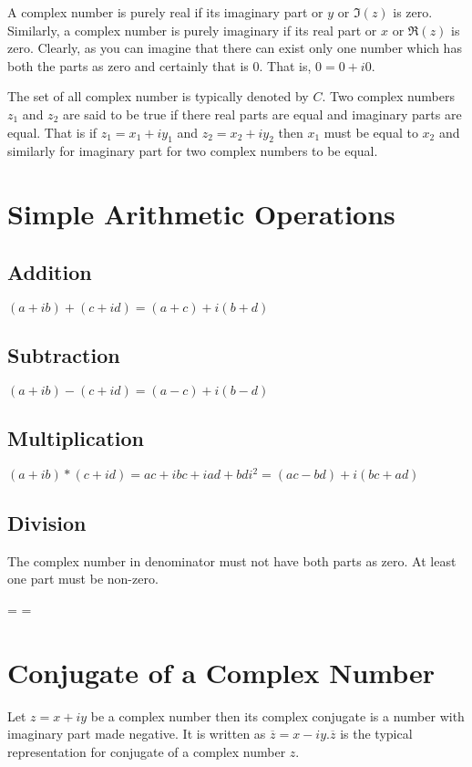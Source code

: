 A complex number is purely real if its imaginary part or $y$ or $\Im(z)$ is zero. Similarly, a complex number is purely imaginary if
its real part or $x$ or $\Re(z)$ is zero. Clearly, as you can imagine that there can exist only one number which has both the parts
as zero and certainly that is $0$. That is, $0=0+i0$.

The set of all complex number is typically denoted by $C$. Two complex numbers $z_1$ and $z_2$ are said to be true if there real
parts are equal and imaginary parts are equal. That is if $z_1=x_1+iy_1$ and $z_2=x_2+iy_2$ then $x_1$ must be equal to $x_2$ and
similarly for imaginary part for two complex numbers to be equal.

\section{Simple Arithmetic Operations}
\subsection{Addition}
$(a + ib) + (c + id) = (a + c) + i(b + d)$
\subsection{Subtraction}
$(a + ib) - (c + id) = (a - c) + i(b - d)$
\subsection{Multiplication}
$(a + ib) * (c + id) = ac + ibc + iad + bdi^2 = (ac - bd) +i(bc + ad)$
\subsection{Division}
The complex number in denominator must not have both parts as zero. At least one part must be non-zero.

\startformula {} =  = \stopformula

\section{Conjugate of a Complex Number}
Let $z = x + iy$ be a complex number then its complex conjugate is a number with imaginary part made negative. It is written as
$\overline{z} = x - iy. \overline{z}$ is the typical representation for conjugate of a complex number $z$.

